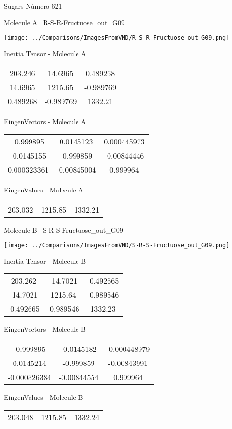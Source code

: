 \vtab[-3cm]
\begin{center}
{\large Sugars \tab Número 621}
\end{center}
\begin{multicols}{2}
\begin{center}

Molecule A \
R-S-R-Fructuose\_out\_G09

\texttt{[image: ../Comparisons/ImagesFromVMD/R-S-R-Fructuose\_out\_G09.png]}

Inertia Tensor - Molecule A \\
\begin{tabular}{|c c c|}
203.246	 & 	14.6965	 & 	0.489268	 \\
14.6965	 & 	1215.65	 & 	-0.989769	 \\
0.489268	 & 	-0.989769	 & 	1332.21
\end{tabular}

\vtab
 EingenVectors - Molecule A     \\
\begin{tabular}{|c c c|}
-0.999895	 & 	0.0145123	 & 	0.000445973	 \\
-0.0145155	 & 	-0.999859	 & 	-0.00844446	 \\
0.000323361	 & 	-0.00845004	 & 	0.999964
\end{tabular}

\vtab
 EingenValues - Molecule A     \\
\begin{tabular}{|c c c|}
203.032	 & 	1215.85	 & 	1332.21	 \\
\end{tabular}
\columnbreak

Molecule B \
S-R-S-Fructuose\_out\_G09

\texttt{[image: ../Comparisons/ImagesFromVMD/S-R-S-Fructuose\_out\_G09.png]}

Inertia Tensor - Molecule B \\
\begin{tabular}{|c c c|}
203.262	 & 	-14.7021	 & 	-0.492665	 \\
-14.7021	 & 	1215.64	 & 	-0.989546	 \\
-0.492665	 & 	-0.989546	 & 	1332.23
\end{tabular}

\vtab
 EingenVectors - Molecule B     \\
\begin{tabular}{|c c c|}
-0.999895	 & 	-0.0145182	 & 	-0.000448979	 \\
0.0145214	 & 	-0.999859	 & 	-0.00843991	 \\
-0.000326384	 & 	-0.00844554	 & 	0.999964
\end{tabular}

\vtab
 EingenValues - Molecule B     \\
\begin{tabular}{|c c c|}
203.048	 & 	1215.85	 & 	1332.24	 \\
\end{tabular}

\end{center}
\end{multicols}

